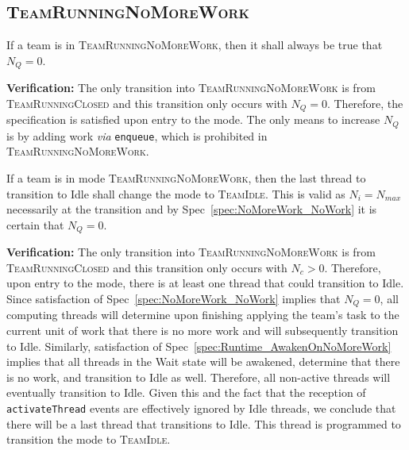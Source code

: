 \documentclass{article}
\newcommand{\TeamIdle}          {\textsc{TeamIdle}}
\newcommand{\TeamRunningClosed} {\textsc{TeamRunningClosed}}
\newcommand{\TeamRunningNoMoreWork} {\textsc{TeamRunningNoMoreWork}}
\begin{document}
\subsection{\TeamRunningNoMoreWork}
\begin{spec}
\label{spec:NoMoreWork_NoWork}
If a team is in \TeamRunningNoMoreWork, then it shall always be true that $N_Q =
0$.
\end{spec}
\textbf{Verification:}\hspace{0.125in}  The only transition into
{\TeamRunningNoMoreWork} is from {\TeamRunningClosed} and this transition only
occurs with $N_Q = 0$.  Therefore, the specification is satisfied upon entry to
the mode.  The only means to increase $N_Q$ is by adding work \textit{via}
\texttt{enqueue}, which is prohibited in \TeamRunningNoMoreWork.

\begin{spec}
\label{spec:NoMoreWork_TransitionToIdle}
If a team is in mode \TeamRunningNoMoreWork, then the last thread to transition
to Idle shall change the mode to \TeamIdle.  This is valid as $N_i =
N_{max}$ necessarily at the transition and by Spec~\ref{spec:NoMoreWork_NoWork}
it is certain that $N_Q = 0$.
\end{spec}
\textbf{Verification:}\hspace{0.125in}  The only transition into
{\TeamRunningNoMoreWork} is from {\TeamRunningClosed} and this transition only
occurs with $N_c > 0$.  Therefore, upon entry to the mode, there is at least one
thread that could transition to Idle.  Since satisfaction of
Spec~\ref{spec:NoMoreWork_NoWork} implies that $N_Q = 0$, all computing threads
will determine upon finishing applying the team's task to the current unit of
work that there is no more work and will subsequently transition to Idle.
Similarly, satisfaction of Spec~\ref{spec:Runtime_AwakenOnNoMoreWork} implies
that all threads in the Wait state will be awakened, determine that there is no
work, and transition to Idle as well.  Therefore, all non-active threads will
eventually transition to Idle.  Given this and the fact that the reception of
\texttt{activateThread} events are effectively ignored by Idle threads, we
conclude that there will be a last thread that transitions to Idle.   This
thread is programmed to transition the mode to \TeamIdle.
\end{document}
